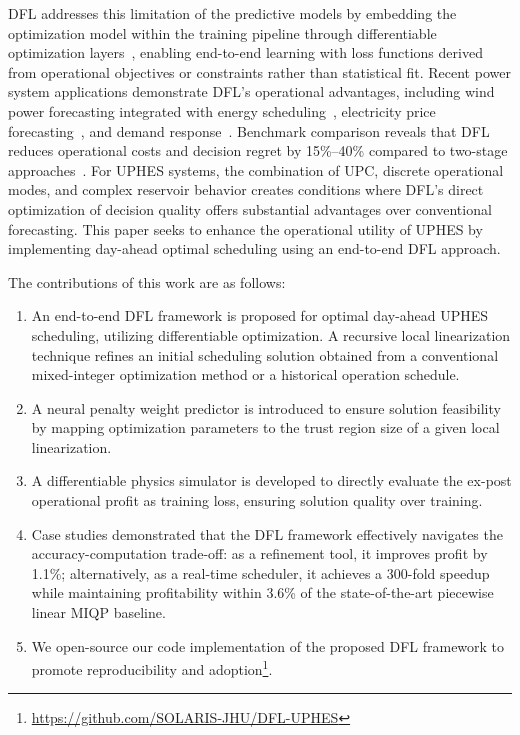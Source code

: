 \documentclass[journal]{IEEEtran}
\begin{document}
DFL addresses this limitation of the predictive models by embedding the optimization model within the training pipeline through differentiable optimization layers~\cite{cvxpylayers2019}, enabling end-to-end learning with loss functions derived from operational objectives or constraints rather than statistical fit. Recent power system applications demonstrate DFL's operational advantages, including wind power forecasting integrated with energy scheduling~\cite{wahdany2023more}, electricity price forecasting~\cite{tschora2023forecasting}, and demand response~\cite{favaro_decision-focused_2025}. Benchmark comparison reveals that DFL reduces operational costs and decision regret by 15\%--40\% compared to two-stage approaches~\cite{zhang2025decision, mandi2024decision}. For UPHES systems, the combination of UPC, discrete operational modes, and complex reservoir behavior creates conditions where DFL's direct optimization of decision quality offers substantial advantages over conventional forecasting.
This paper seeks to enhance the operational utility of UPHES by implementing day-ahead optimal scheduling using an end-to-end DFL approach. 

\noindent The contributions of this work are as follows:

\begin{enumerate}
    \item An end-to-end DFL framework is proposed for optimal day-ahead UPHES scheduling, utilizing differentiable optimization. A recursive local linearization technique refines an initial scheduling solution obtained from a conventional mixed-integer optimization method or a historical operation schedule.
    \item A neural penalty weight predictor is introduced to ensure solution feasibility by mapping optimization parameters to the trust region size of a given local linearization.
    \item A differentiable physics simulator is developed to directly evaluate the ex-post operational profit as training loss, ensuring solution quality over training.
    \item Case studies demonstrated that the DFL framework effectively navigates the accuracy-computation trade-off: as a refinement tool, it improves profit by 1.1\%; alternatively, as a real-time scheduler, it achieves a 300-fold speedup while maintaining profitability within 3.6\% of the state-of-the-art piecewise linear MIQP  baseline.
    \item We open-source our code implementation of the proposed DFL framework to promote reproducibility and adoption\footnote{\url{https://github.com/SOLARIS-JHU/DFL-UPHES}}.
\end{enumerate}
\end{document}

